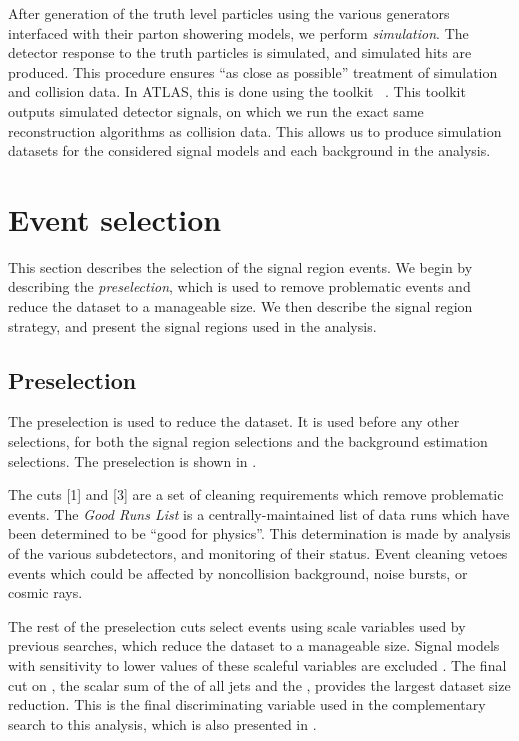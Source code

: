 After generation of the truth level particles using the various generators interfaced with their parton showering models, we perform \textit{simulation}.
The detector response to the truth particles is simulated, and simulated hits are produced.
This procedure ensures ``as close as possible'' treatment of simulation and collision data.
In ATLAS, this is done using the \GEANTFour toolkit ~\cite{Agostinelli:2002hh}.
This toolkit outputs simulated detector signals, on which we run the exact same reconstruction algorithms as collision data.
This allows us to produce simulation datasets for the considered signal models and each background in the analysis.

\section{Event selection}

This section describes the selection of the signal region events.
We begin by describing the \textit{preselection}, which is used to remove problematic events and reduce the dataset to a manageable size.
We then describe the signal region strategy, and present the signal regions used in the analysis.

\subsection{Preselection}

The preselection is used to reduce the dataset.
It is used before any other selections, for both the signal region selections and the background estimation selections.
The preselection is shown in .

The cuts [1] and [3] are a set of cleaning requirements which remove problematic events.
The \textit{Good Runs List} is a centrally-maintained list of data runs which have been determined to be ``good for physics''.
This determination is made by analysis of the various subdetectors, and monitoring of their status.
Event cleaning vetoes events which could be affected by noncollision background, noise bursts, or cosmic rays.

The rest of the preselection cuts select events using scale variables used by previous searches, which reduce the dataset to a manageable size.
Signal models with sensitivity to lower values of these scaleful variables are excluded \cite{0-leptonPaper,0LPaper_13TeV}.
The final cut on \meff, the scalar sum of the \pt of all jets and the \met, provides the largest dataset size reduction.
This is the final discriminating variable used in the complementary search to this analysis, which is also presented in \cite{ATLAS-CONF-2016-078}.

